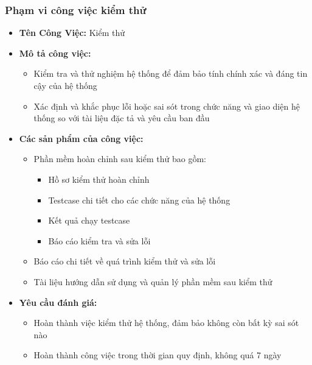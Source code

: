 \subsubsection{Phạm vi công việc kiểm thử}
\begin{itemize}
    \item \textbf{Tên Công Việc:} Kiểm thử
    \item \textbf{Mô tả công việc:}
    \begin{itemize}
        \item Kiểm tra và thử nghiệm hệ thống để đảm bảo tính chính xác và đáng tin cậy của hệ thống
        \item Xác định và khắc phục lỗi hoặc sai sót trong chức năng và giao diện hệ thống so với tài liệu đặc tả và yêu cầu ban đầu
    \end{itemize}
    \item \textbf{Các sản phẩm của công việc:}
    \begin{itemize}
        \item Phần mềm hoàn chỉnh sau kiểm thử bao gồm:
        \begin{itemize}
            \item Hồ sơ kiểm thử hoàn chỉnh
            \item Testcase chi tiết cho các chức năng của hệ thống
            \item Kết quả chạy testcase
            \item Báo cáo kiểm tra và sửa lỗi
        \end{itemize}
        \item Báo cáo chi tiết về quá trình kiểm thử và sửa lỗi
        \item Tài liệu hướng dẫn sử dụng và quản lý phần mềm sau kiểm thử
    \end{itemize}
    \item \textbf{Yêu cầu đánh giá:}
    \begin{itemize}
        \item Hoàn thành việc kiểm thử hệ thống, đảm bảo không còn bất kỳ sai sót nào
        \item Hoàn thành công việc trong thời gian quy định, không quá 7 ngày
    \end{itemize}
\end{itemize}
